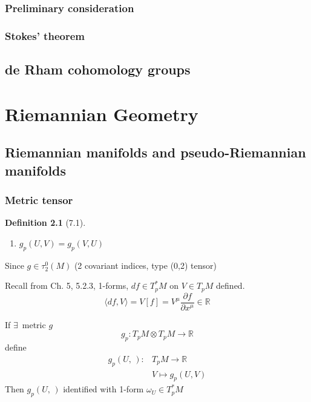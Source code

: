 \documentclass{book}
\newtheorem{definition}{Definition}
\begin{document}
\subsection{ Preliminary consideration }


\subsection{ Stokes' theorem }

\section{ de Rham cohomology groups }





\chapter{Riemannian Geometry}

\section{ Riemannian manifolds and pseudo-Riemannian manifolds }

\subsection{ Metric tensor }

\begin{definition}[7.1]
\begin{enumerate}
  \item[(i)] $  g_p(U,V) = g_p(V,U) $
\end{enumerate}
\end{definition}

Since $g \in \tau_2^0(M)$ (2 covariant indices, type (0,2) tensor)

Recall from Ch. 5, 5.2.3, 1-forms, 
$df \in T_p^* M$ on $V \in T_p M$ defined. 
\[
\langle df, V \rangle = V[f] = V^{\mu} \frac{ \partial f}{ \partial x^{\mu} } \in \mathbb{R}
\]

If $\exists \, $ metric $g$
\[
g_p : T_p M \otimes T_p M \to \mathbb{R}
\]
define
\[
\begin{aligned}
  g_p(U, \, ) : & T_p M \to \mathbb{R} \\
  & V \mapsto g_p(U,V)
\end{aligned}
\]
Then $g_p(U, \, )$ identified with 1-form $\omega_U \in T_p^*M$ 
\end{document}
